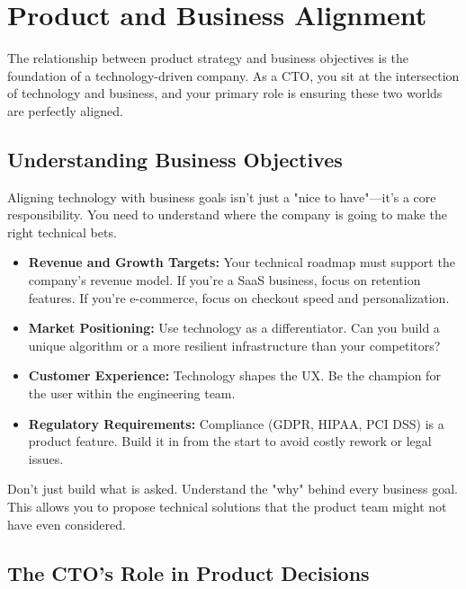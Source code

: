 \section{Product and Business Alignment}

The relationship between product strategy and business objectives is the foundation of a technology-driven company. As a \gls{CTO}, you sit at the intersection of technology and business, and your primary role is ensuring these two worlds are perfectly aligned.

\subsection{Understanding Business Objectives}

Aligning technology with business goals isn't just a "nice to have"—it's a core responsibility. You need to understand where the company is going to make the right technical bets.

\begin{itemize}
    \item \textbf{Revenue and Growth Targets:} Your technical roadmap must support the company's revenue model. If you're a \gls{SaaS} business, focus on retention features. If you're e-commerce, focus on checkout speed and personalization.
    \item \textbf{Market Positioning:} Use technology as a differentiator. Can you build a unique algorithm or a more resilient infrastructure than your competitors?
    \item \textbf{Customer Experience:} Technology shapes the \gls{UX}. Be the champion for the user within the engineering team.
    \item \textbf{Regulatory Requirements:} Compliance (GDPR, HIPAA, PCI DSS) is a product feature. Build it in from the start to avoid costly rework or legal issues.
\end{itemize}

\begin{tipbox}
    Don't just build what is asked. Understand the "why" behind every business goal. This allows you to propose technical solutions that the product team might not have even considered.
\end{tipbox}

\subsection{The CTO's Role in Product Decisions}

